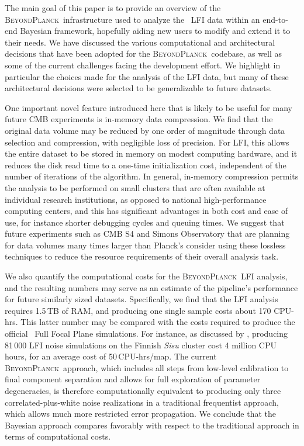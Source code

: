 \documentclass[twocolumn]{aa}
\newcommand{\BP}{\textsc{BeyondPlanck}}
\begin{document}
The main goal of this paper is to provide an overview of the
\BP\ infrastructure used to analyze the \Planck\ LFI data within an
end-to-end Bayesian framework, hopefully aiding new users to modify
and extend it to their needs. We have discussed the various
computational and architectural decisions that have been adopted for
the \BP\ codebase, as well as some of the current challenges facing
the development effort. We highlight in particular the choices made
for the analysis of the LFI data, but many of these architectural
decisions were selected to be generalizable to future datasets.

One important novel feature introduced here that is likely to be
useful for many future CMB experiments is in-memory data
compression. We find that the original data volume may be reduced by
one order of magnitude through data selection and compression, with
negligible loss of precision. For LFI, this allows the entire dataset
to be stored in memory on modest computing hardware, and it reduces
the disk read time to a one-time initialization cost, independent of
the number of iterations of the algorithm. In general, in-memory
compression permits the analysis to be performed on small clusters
that are often available at individual research institutions, as
opposed to national high-performance computing centers, and this has
significant advantages in both cost and ease of use, for instance
shorter debugging cycles and queuing times. We suggest that future
experiments such as CMB S4 and Simons Observatory that are planning for data
volumes many times larger than Planck's consider using these lossless
techniques to reduce the resource requirements of their overall
analysis task.

We also quantify the computational costs for the \BP\ LFI analysis,
and the resulting numbers may serve as an estimate of the pipeline's
performance for future similarly sized datasets. Specifically, we find
that the LFI analysis requires 1.5\,TB of RAM, and producing one
single sample costs about 170 CPU-hrs. This latter number may be
compared with the costs required to produce the official \Planck\ Full
Focal Plane simulations. For instance, as discussed by
\citet{planck2014-a14}, producing 81\,000 LFI noise simulations on the
Finnish \emph{Sisu} cluster cost 4 million CPU hours, for an average
cost of 50\,CPU-hrs/map. The current \BP\ approach, which includes all
steps from low-level calibration to final component separation and
allows for full exploration of parameter degeneracies, is therefore
computationally equivalent to producing only three
correlated-plus-white noise realizations in a traditional frequentist
approach, which allows much more restricted error propagation. We
conclude that the Bayesian approach compares favorably with respect to
the traditional approach in terms of computational costs.
\end{document}
